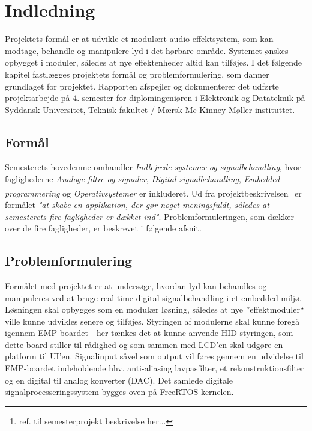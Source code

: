 \chapter{Indledning}
\vspace*{0.5 cm}
Projektets formål er at udvikle et modulært audio effektsystem, som kan modtage, behandle og manipulere lyd i det hørbare område. 
Systemet ønskes opbygget i moduler, således at nye effektenheder altid kan tilføjes. \newline
I det følgende kapitel fastlægges projektets formål og problemformulering, som danner grundlaget for projektet.
Rapporten afspejler og dokumenterer det udførte projektarbejde på 4. semester for diplomingeniøren i Elektronik og Datateknik på Syddansk Universitet, Teknisk fakultet / Mærsk Mc Kinney Møller instituttet.

\section{Formål}
Semesterets hovedemne omhandler \emph{Indlejrede systemer og signalbehandling}, hvor faglighederne \emph{Analoge filtre og signaler}, \emph{Digital signalbehandling}, \emph{Embedded programmering} og \emph{Operativsystemer} er inkluderet.
Ud fra projektbeskrivelsen\footnote{ref. til  semesterprojekt beskrivelse her...} er formålet\textit{ "at skabe en applikation, der gør noget meningsfuldt, således at semesterets fire fagligheder er dækket ind"}. \newline
Problemformuleringen, som dækker over de fire fagligheder, er beskrevet i følgende afsnit. 


\section{Problemformulering}
Formålet med projektet er at undersøge, hvordan lyd kan behandles og manipuleres ved at bruge real-time digital signalbehandling i et embedded miljø.
Løsningen skal opbygges som en modulær løsning, således at nye ''effektmoduler`` ville kunne udvikles senere og tilføjes. 
Styringen af modulerne skal kunne foregå igennem EMP boardet - her tænkes det at kunne anvende HID styringen, som dette board stiller til rådighed og som sammen med LCD'en skal udgøre en platform til UI'en. 
Signalinput såvel som output vil føres gennem en udvidelse til EMP-boardet indeholdende hhv. anti-aliasing lavpasfilter, et rekonstruktionsfilter og en digital til analog konverter (DAC).
Det samlede digitale signalprocesseringssystem bygges oven på FreeRTOS kernelen.

